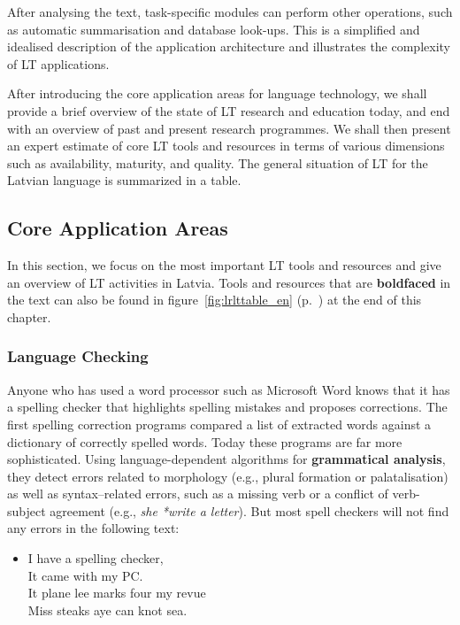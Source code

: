 \begin{multicols}{2}
After analysing the text, task-specific modules can perform other operations, such as automatic summarisation and database look-ups.
This is a simplified and idealised description of the application architecture and illustrates the complexity of LT applications.

After introducing the core application areas for language technology, we shall provide a brief overview of the state of LT research and education today, and end with an overview of past and present research programmes.
We shall then present an expert estimate of core LT tools and resources in terms of various dimensions such as availability, maturity, and quality.
The general situation of LT for the Latvian language is summarized in a table.

\subsection{Core Application Areas}

In this section, we focus on the most important LT tools and resources and give an overview of LT activities in Latvia.
Tools and resources that are \textbf{boldfaced} in the text can also be found in figure~\ref{fig:lrlttable_en} (p.~\pageref{fig:lrlttable_en}) at the end of this chapter.


\subsubsection{Language Checking}

Anyone who has used a word processor such as Microsoft Word knows that it has a spelling checker that highlights spelling mistakes and proposes corrections.
The first spelling correction programs compared a list of extracted words against a dictionary of correctly spelled words.
Today these programs are far more sophisticated.
Using language-dependent algorithms for \textbf{grammatical analysis}, they detect errors related to morphology (e.g., plural formation or palatalisation) as well as syntax--related errors, such as a missing verb or a conflict of verb-subject agreement (e.g., \textit{she *write a letter}).
But most spell checkers will not find any errors in the following text:  

\begin{itemize}
\item[] I have a spelling checker,\\
  It came with my PC.\\
  It plane lee marks four my revue\\
  Miss steaks aye can knot sea.\cite{Meta15}
\end{itemize}


\end{multicols}
